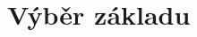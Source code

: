\documentclass[thesis=B,czech]{FITthesis}[2011/06/14]
\begin{document}
\section{Výběr základu}
% 
% 
% 
% 
% 
% 
% 
% 
 
\end{document}
